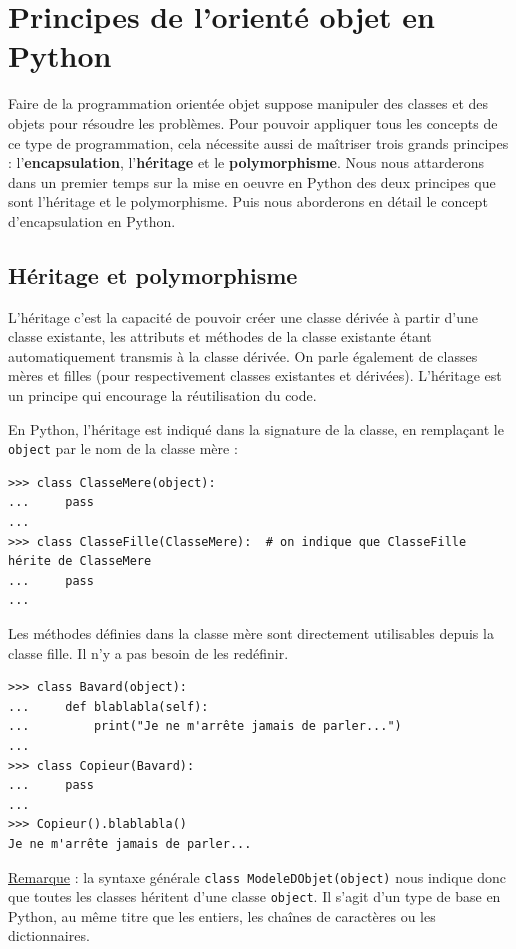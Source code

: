 \documentclass[12pt, a4paper]{article}
\begin{document}
\section{Principes de l'orienté objet en Python}
Faire de la programmation orientée objet suppose manipuler des classes et des objets pour résoudre les problèmes. Pour pouvoir appliquer tous les concepts de ce type de programmation, cela nécessite aussi de maîtriser trois grands principes : l'\textbf{encapsulation}, l'\textbf{héritage} et le \textbf{polymorphisme}. Nous nous attarderons dans un premier temps sur la mise en oeuvre en Python des deux principes que sont l'héritage et le polymorphisme. Puis nous aborderons en détail le concept d'encapsulation en Python.


\subsection{Héritage et polymorphisme}
L'héritage c'est la capacité de pouvoir créer une classe dérivée à partir d'une classe existante,  les attributs et méthodes de la classe existante étant automatiquement transmis à la classe dérivée. On parle également de classes mères et filles (pour respectivement classes existantes et dérivées). L'héritage est un principe qui encourage la réutilisation du code.

En Python, l'héritage est indiqué dans la signature de la classe, en remplaçant le \lstinline{object} par le nom de la classe mère :
\begin{lstlisting}
>>> class ClasseMere(object):
...     pass
...
>>> class ClasseFille(ClasseMere):  # on indique que ClasseFille hérite de ClasseMere
...     pass
...
\end{lstlisting}

Les méthodes définies dans la classe mère sont directement utilisables depuis la classe fille. Il n'y a pas besoin de les redéfinir.
\begin{lstlisting}
>>> class Bavard(object):
...     def blablabla(self):
...         print("Je ne m'arrête jamais de parler...")
...
>>> class Copieur(Bavard):
...     pass
...
>>> Copieur().blablabla()
Je ne m'arrête jamais de parler...
\end{lstlisting}

\underline{Remarque} : la syntaxe générale \lstinline{class ModeleDObjet(object)} nous indique donc que toutes les classes héritent d'une classe \lstinline{object}. Il s'agit d'un type de base en Python, au même titre que les entiers, les chaînes de caractères ou les dictionnaires.
\end{document}
